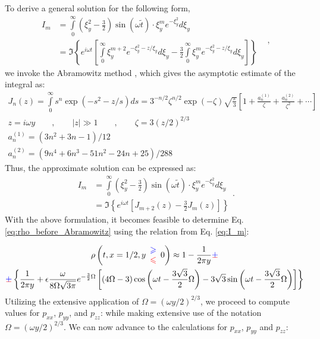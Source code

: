 To derive a general solution for the following form,
\begin{equation*}
    \begin{aligned}
        I_m & =\int\limits_{0}^{\infty} \left( \xi_y^2 - \frac{3}{2} \right) \sin\left( \omega \tilde{t} \right) \cdot \xi_y^m e^{-\xi_y^2} d\xi_y & \\
        & =\Im \left\{e^{i\omega t}\left[\int\limits _{0}^{\infty } \xi _{y}^{m+2} e^{-\xi _{y}^{2} -z/\xi _{y}} d\xi _{y} -\frac{3}{2}\int\limits _{0}^{\infty } \xi _{y}^{m} e^{-\xi _{y}^{2} -z/\xi _{y}} d\xi _{y}\right]\right\}
\end{aligned}
,
\end{equation*}
we invoke the Abramowitz method \cite{abramowitz1953evaluation}, which gives the asymptotic estimate of the integral as:
\begin{gather*}
J_{n}( z) =\int\limits _{0}^{\infty } s^{n}\exp\left( -s^{2} -z/s\right) ds=3^{-n/2} \zeta ^{n/2}\exp( -\zeta )\sqrt{\frac{\pi }{3}}\left[ 1+\frac{a_{n}^{( 1)}}{\zeta } +\frac{a_{n}^{( 2)}}{\zeta ^{2}} +\cdots \right]\\
z=i\omega y\quad \quad ,\quad \quad | z| \gg 1\quad \quad ,\quad \quad \zeta =3( z/2)^{2/3}\\
a_{n}^{( 1)} =\left( 3n^{2} +3n-1\right) /12\\
a_{n}^{( 2)} =\left( 9n^{4} +6n^{3} -51n^{2} -24n+25\right) /288
\end{gather*}
Thus, the approximate solution can be expressed as:
\begin{equation}\label{eq:I_m}
\begin{aligned}
    I_m & =\int\limits_0^\infty \left( \xi_y^2 - \frac{3}{2} \right) \sin\left( \omega\tilde{t} \right) \cdot \xi_y^m e^{-\xi_y^2} d\xi_y \\
     & =
     \Im \left\{ e^{i\omega t}\left[ J_{m+2}(z) - \frac{3}{2} J_{m}(z) \right]\right\}
\end{aligned}
.
\end{equation}
With the above formulation, it becomes feasible to determine Eq. \ref{eq:rho_before_Abramowitz} using the relation from Eq. \ref{eq:I_m}:

\begin{multline}
\rho \left( t,x=1/2,y\begin{array}{ c }
\textcolor[rgb]{0,0,1}{\geqslant }\\
\textcolor[rgb]{1,0,0}{\leqslant }
\end{array} 0\right)
\approx
1-\frac{1}{2\pi y} \cpm \\
\cpm \left\{\frac{1}{2\pi y} + \epsilon \frac{\omega }{8\Omega \sqrt{3\pi }} e^{-\frac{3}{2} \Omega }\left[( 4\Omega -3)\cos\left( \omega t-\frac{3\sqrt{3}}{2} \Omega \right) -3\sqrt{3}\sin\left( \omega t-\frac{3\sqrt{3}}{2} \Omega \right)\right]\right\}
\end{multline}
Utilizing the extensive application of \( \Omega =\left(\omega y/2\right)^{2/3} \), we proceed to compute values for \( p_{xx} \), \( p_{yy} \), and \( p_{zz} \):
while making extensive use of the notation $\Omega =\left(\omega y/2\right)^{2/3}$. We can now advance to the calculations for $p_{xx}$, $p_{yy}$ and $p_{zz}$:

